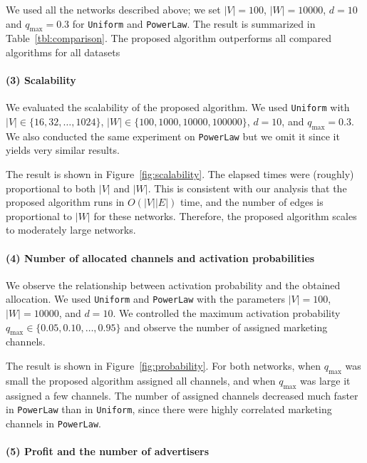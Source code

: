 \documentclass[letterpaper]{article}
\theoremstyle{definition}
\begin{document}
We used all the networks described above; we set $|V| = 100$, $|W| = 10000$, $d = 10$ and $q_{\text{max}} = 0.3$ for \texttt{Uniform} and \texttt{PowerLaw}.
The result is summarized in Table~\ref{tbl:comparison}.
The proposed algorithm outperforms all compared algorithms for all datasets


\paragraph{(3) Scalability}

We evaluated the scalability of the proposed algorithm.
We used \texttt{Uniform} with $|V| \in \{16, 32, \ldots, 1024\}$, $|W| \in \{100, 1000, 10000, 100000\}$, $d = 10$, and $q_{\text{max}} = 0.3$.
We also conducted the same experiment on \texttt{PowerLaw} but we omit it since it yields very similar results.

The result is shown in Figure~\ref{fig:scalability}.
The elapsed times were (roughly) proportional to both $|V|$ and $|W|$.
This is consistent with our analysis that the proposed algorithm runs in $O(|V| |E|)$ time, and the number of edges is proportional to $|W|$ for these networks.
Therefore, the proposed algorithm scales to moderately large networks.

\paragraph{(4) Number of allocated channels and activation probabilities}

We observe the relationship between activation probability and the obtained allocation.
We used \texttt{Uniform} and \texttt{PowerLaw} with the parameters $|V| = 100$,  $|W| = 10000$, and $d = 10$.
We controlled the maximum activation probability $q_{\text{max}} \in \{0.05, 0.10, \ldots, 0.95\}$ and observe the number of assigned marketing channels.

The result is shown in Figure~\ref{fig:probability}.
For both networks, when $q_{\text{max}}$ was small the proposed algorithm assigned all channels, and when $q_{\text{max}}$ was large it assigned a few channels.
The number of assigned channels decreased much faster in \texttt{PowerLaw} than in \texttt{Uniform}, since there were highly correlated marketing channels in \texttt{PowerLaw}.

\paragraph{(5) Profit and the number of advertisers}
\end{document}
